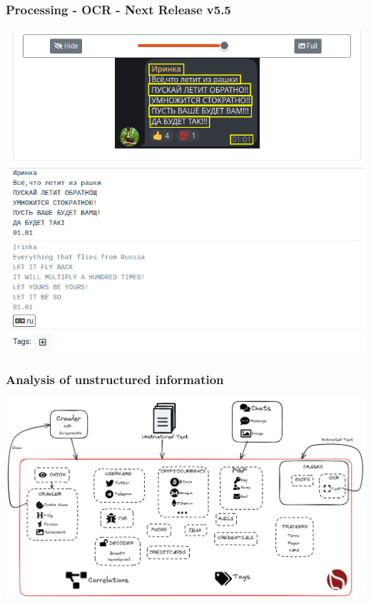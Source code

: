 \documentclass{beamer}
\begin{document}
\begin{frame}
    \frametitle{Processing - OCR - Next Release v5.5}
    \begin{center}
        \includegraphics[scale=0.32]{screenshot/ail-ocr.png}
    \end{center}
\end{frame}

\begin{frame}
    \frametitle{Analysis of unstructured information}
    \begin{center}
        \includegraphics[scale=0.225]{images/ail-internal.png}
    \end{center}
\end{frame}
\end{document}
